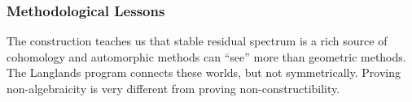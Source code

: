 \documentclass[12pt]{amsart}
\theoremstyle{definition}
\begin{document}
\subsubsection{Methodological Lessons}

The construction teaches us that stable residual spectrum is a rich source of cohomology and automorphic methods can ``see'' more than geometric methods. The Langlands program connects these worlds, but not symmetrically. Proving non-algebraicity is very different from proving non-constructibility.


\end{document}
